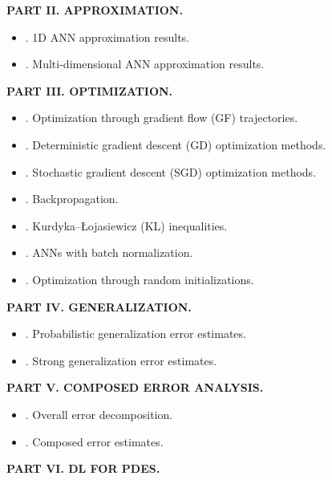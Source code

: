 \documentclass{article}
\begin{document}
{\bf PART II. APPROXIMATION.}
\begin{itemize}
	\item {. 1D ANN approximation results.}
	\item {. Multi-dimensional ANN approximation results.}
\end{itemize}
{\bf PART III. OPTIMIZATION.}
\begin{itemize}
	\item {. Optimization through gradient flow (GF) trajectories.}
	\item {. Deterministic gradient descent (GD) optimization methods.}
	\item {. Stochastic gradient descent (SGD) optimization methods.}
	\item {. Backpropagation.}
	\item {. Kurdyka--\L ojasiewicz (KL) inequalities.}
	\item {. ANNs with batch normalization.}
	\item {. Optimization through random initializations.}
\end{itemize}
{\bf PART IV. GENERALIZATION.}
\begin{itemize}
	\item {. Probabilistic generalization error estimates.}
	\item {. Strong generalization error estimates.}
\end{itemize}
{\bf PART V. COMPOSED ERROR ANALYSIS.}
\begin{itemize}
	\item {. Overall error decomposition.}
	\item {. Composed error estimates.}
\end{itemize}
{\bf PART VI. DL FOR PDES.}
\end{document}
